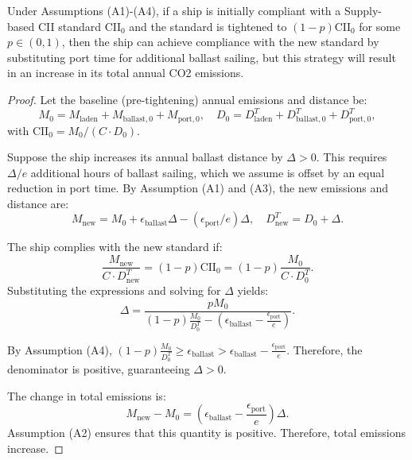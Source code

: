 \documentclass[10pt,a4paper]{amsart}
\begin{document}
\begin{proposition}
Under Assumptions (A1)-(A4), if a ship is initially compliant with a Supply-based CII standard $\mathrm{CII}_0$ and the standard is tightened to $(1-p)\mathrm{CII}_0$ for some $p \in (0,1)$, then the ship can achieve compliance with the new standard by substituting port time for additional ballast sailing, but this strategy will result in an increase in its total annual CO2 emissions.
\end{proposition}

\begin{proof}
Let the baseline (pre-tightening) annual emissions and distance be:
\[
M_0 = M_{\text{laden}} + M_{\text{ballast},0} + M_{\text{port},0}, \quad D_0 = D^T_{\text{laden}} + D^T_{\text{ballast},0} + D^T_{\text{port},0},
\]
with $\mathrm{CII}_0 = M_0 / (C \cdot D_0)$. 

Suppose the ship increases its annual ballast distance by $\Delta > 0$. This requires $\Delta / e$ additional hours of ballast sailing, which we assume is offset by an equal reduction in port time. By Assumption (A1) and (A3), the new emissions and distance are:
\[
M_{\text{new}} = M_0 + \epsilon_{\text{ballast}} \Delta - (\epsilon_{\text{port}} / e) \Delta, \quad D^T_{\text{new}} = D_0 + \Delta.
\]

The ship complies with the new standard if:
\[
\frac{M_{\text{new}}}{C \cdot D^T_{\text{new}}} = (1-p)\mathrm{CII}_0=(1-p)\frac{M_0}{C\cdot D_0^T}.
\]
Substituting the expressions and solving for $\Delta$ yields:
\[
\Delta = \frac{p M_0}{(1-p)\frac{M_0}{D_0^T} - \left(\epsilon_{\text{ballast}} - \frac{\epsilon_{\text{port}}}{e}\right)}.
\]

By Assumption (A4), $(1-p)\frac{M_0}{D^T_0} \ge \epsilon_{\text{ballast}} > \epsilon_{\text{ballast}} - \frac{\epsilon_{\text{port}}}{e}$. Therefore, the denominator is positive, guaranteeing $\Delta > 0$.

The change in total emissions is:
\[
M_{\text{new}} - M_0 = \left(\epsilon_{\text{ballast}} - \frac{\epsilon_{\text{port}}}{e}\right) \Delta.
\]
Assumption (A2) ensures that this quantity is positive. Therefore, total emissions increase.
\end{proof}
\end{document}
